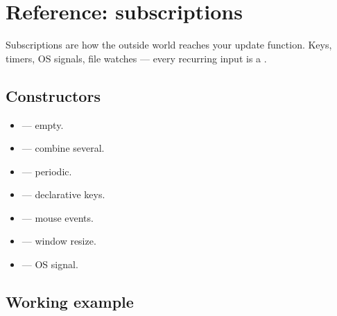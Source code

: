 \chapter{Reference: subscriptions}
\label{ch:refman-sub}

\begin{aside}
Subscriptions are how the outside world reaches your update
function. Keys, timers, OS signals, file watches — every
recurring input is a .
\end{aside}

\section{Constructors}

\begin{itemize}[leftmargin=*]
  \item {} — empty.
  \item {} — combine several.
  \item {} — periodic.
  \item {} — declarative keys.
  \item {} — mouse events.
  \item {} — window resize.
  \item {} — OS signal.
\end{itemize}

\section{Working example}

